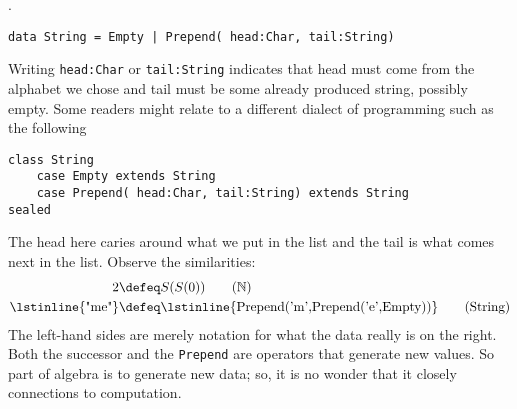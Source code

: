 .
\begin{lstlisting}[language=Hidris]
data String = Empty | Prepend( head:Char, tail:String) 
\end{lstlisting}
Writing \lstinline{head:Char} or \lstinline{tail:String} 
indicates that head must come from the alphabet we chose 
and tail must be some already produced string, possibly empty.
Some readers might relate to a different dialect of 
programming such as the following
\begin{lstlisting}[language=Sava]
class String
    case Empty extends String
    case Prepend( head:Char, tail:String) extends String
sealed
\end{lstlisting}
The head here caries around what we put in the list and the tail 
is what comes next in the list.  Observe the similarities:
\begin{align}
     2 & \defeq S(S(0)) \tag{$\mathbb{N}$}\\
 \text{\lstinline{"me"}} & \defeq \text{\lstinline{Prepend('m',Prepend('e',Empty))}}
\tag{String}
\end{align}
The left-hand sides are merely notation for what the data really is on the right.
Both the successor and the \lstinline{Prepend} are operators that generate 
new values.  So part of algebra is to generate new data; so, it is no wonder 
that it closely connections to computation.

